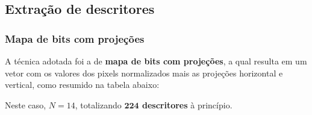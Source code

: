 \subsection[Subsection]{Extração de descritores}
\begin{frame}
	\frametitle{Mapa de bits com projeções}
	A técnica adotada foi a de \textbf{mapa de bits com projeções}, a qual resulta em um vetor com os valores
	dos pixels normalizados mais as projeções horizontal
	e vertical, como resumido na tabela abaixo:

	\begin{table}[H]
	\end{table}
Neste caso, $N = 14$, totalizando \textbf{$\mathbf{224}$ descritores} à princípio.

\end{frame}

